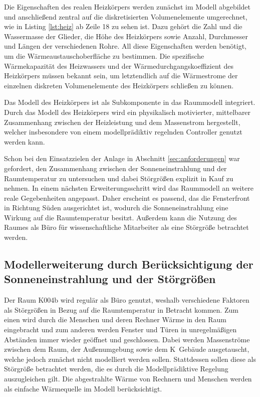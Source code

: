 Die Eigenschaften des realen Heizkörpers werden zunächst im Modell abgebildet und anschließend zentral auf die diskretisierten Volumenelemente umgerechnet, wie in Listing \ref{lst:heiz} ab Zeile 18 zu sehen ist. Dazu gehört die Zahl und die Wassermasse der Glieder, die Höhe des Heizkörpers sowie Anzahl, Durchmesser und Längen der verschiedenen Rohre. All diese Eigenschaften werden benötigt, um die Wärmeaustauschoberfläche zu bestimmen. Die spezifische Wärmekapazität des Heizwassers und der Wärmedurchgangskoeffizient des Heizkörpers müssen bekannt sein, um letztendlich auf die Wärmestrome der einzelnen diskreten Volumenelemente des Heizkörpers schließen zu können.



Das Modell des Heizkörpers ist als Subkomponente in das Raummodell integriert. Durch das Modell des Heizkörpers wird ein physikalisch motivierter, mittelbarer Zusammenhang zwischen der Heizleistung und dem Massenstrom hergestellt, welcher insbesondere von einem modellprädiktiv regelnden Controller genutzt werden kann.

Schon bei den Einsatzzielen der Anlage in Abschnitt \ref{sec:anforderungen} war gefordert, den Zusammenhang zwischen der Sonneneinstrahlung und der Raumtemperatur zu untersuchen und dabei Störgrößen explizit in Kauf zu nehmen. In einem nächsten Erweiterungsschritt wird das Raummodell an weitere reale Gegebenheiten angepasst. Daher erscheint es passend, das die Fensterfront in Richtung Süden ausgerichtet ist, wodurch die Sonneneinstrahlung eine Wirkung auf die Raumtemperatur besitzt. Außerdem kann die Nutzung des Raumes als Büro für wissenschaftliche Mitarbeiter als eine Störgröße betrachtet werden.

\subsection{Modellerweiterung durch Berücksichtigung der Sonneneinstrahlung und der Störgrößen}
\label{sub:modsonne}

Der Raum K004b wird regulär als Büro genutzt, weshalb verschiedene Faktoren als Störgrößen in Bezug auf die Raumtemperatur in Betracht kommen. Zum einen wird durch die Menschen und deren Rechner Wärme in den Raum eingebracht und zum anderen werden Fenster und Türen in unregelmäßigen Abständen immer wieder geöffnet und geschlossen. Dabei werden Massenströme zwischen dem Raum, der Außenumgebung sowie dem K~Gebäude ausgetauscht, welche jedoch zunächst nicht modelliert werden sollen. Stattdessen sollen diese als Störgröße betrachtet werden, die es durch die Modellprädiktive Regelung auszugleichen gilt. Die abgestrahlte Wärme von Rechnern und Menschen werden als einfache Wärmequelle im Modell berücksichtigt. 

